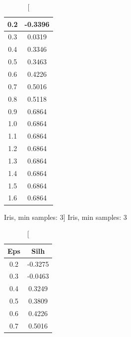 \documentclass{classrep}
\begin{document}
{{{\begin{table}[!htbp]
\begin{minipage}{.24\textwidth}
\begin{tabular}{|c|c|}
                            0.2 & -0.3396 \\ \hline
                            0.3 & 0.0319 \\ \hline
                            0.4 & 0.3346 \\ \hline
                            0.5 & 0.3463 \\ \hline
                            0.6 & 0.4226 \\ \hline
                            0.7 & 0.5016 \\ \hline
                            0.8 & 0.5118 \\ \hline
                            0.9 & 0.6864 \\ \hline
                            1.0 & 0.6864 \\ \hline
                            1.1 & 0.6864 \\ \hline
                            1.2 & 0.6864 \\ \hline
                            1.3 & 0.6864 \\ \hline
                            1.4 & 0.6864 \\ \hline
                            1.5 & 0.6864 \\ \hline
                            1.6 & 0.6864 \\ \hline
                        \end{tabular}
                        \caption
                        [Iris, min samples: 3]
                        {Iris, min samples: 3}
                        \label{db_scan_table_Iris_eucl_min_sample3}
                    \end{minipage}
                    \hfill
                    \begin{minipage}{.24\textwidth}
                        \centering
                        \begin{tabular}{|c|c|}
                            \hline
                            Eps & Silh \\ \hline
                            0.2 & -0.3275 \\ \hline
                            0.3 & -0.0463 \\ \hline
                            0.4 & 0.3249 \\ \hline
                            0.5 & 0.3809 \\ \hline
                            0.6 & 0.4226 \\ \hline
                            0.7 & 0.5016 \\ \hline

\end{tabular}
\end{minipage}
\end{table}}}}
\end{document}
